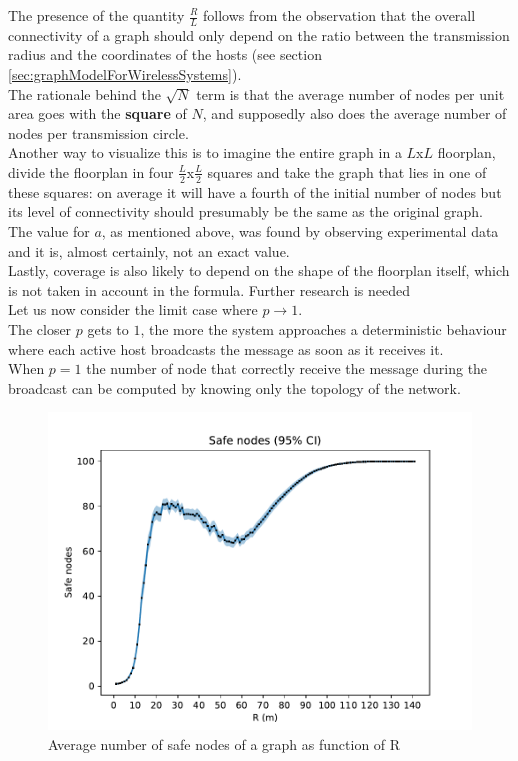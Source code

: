The presence of the quantity $\frac{R}{L}$ follows from the observation that the overall connectivity of a graph should only depend on the ratio between the transmission radius and the coordinates of the hosts (see section \ref{sec:graphModelForWirelessSystems}).\\
The rationale behind the $\sqrt{N}$ term is that the average number of nodes per unit area goes with the \textbf{square} of $N$, and supposedly also does the average number of nodes per transmission circle.\\
Another way to visualize this is to imagine the entire graph in a $L$x$L$ floorplan, divide the floorplan in four $\frac{L}{2}$x$\frac{L}{2}$ squares and take the graph that lies in one of these squares: on average it will have a fourth of the initial number of nodes but its level of connectivity should presumably be the same as the original graph.\\
The value for $a$, as mentioned above, was found by observing experimental data and it is, almost certainly, not an exact value.\\
Lastly, coverage is also likely to depend on the shape of the floorplan itself, which is not taken in account in the formula. Further research is needed\\
\hfill \break
Let us now consider the limit case where $p \to 1$.\\
The closer $p$ gets to $1$, the more the system approaches a deterministic behaviour where each active host broadcasts the message as soon as it receives it.\\
When $p=1$ the number of node that correctly receive the message during the broadcast can be computed by knowing only the topology of the network.\\
\begin{figure}[H]
    \begin{center}
        \includegraphics[scale=.6]{img/graphAnalysisSafe_nodes.pdf}
    \end{center}
    \vspace*{-0.5cm}
    \caption{Average number of safe nodes of a graph as function of R}
    \label{fig:safeNodes}
\end{figure}
